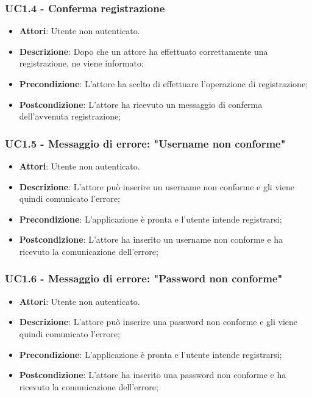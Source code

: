 \subsubsection{UC1.4 - Conferma registrazione} 
\label{sssec:UC1.4} 
\begin{itemize} 
\item \textbf{Attori}: Utente non autenticato.
\item \textbf{Descrizione}: Dopo che un attore ha effettuato correttamente una registrazione, ne viene informato;
\item \textbf{Precondizione}: L'attore ha scelto di effettuare l'operazione di registrazione;
\item \textbf{Postcondizione}: L'attore ha ricevuto un messaggio di conferma dell'avvenuta registrazione;
\end{itemize} 
\subsubsection{UC1.5 - Messaggio di errore: "Username non conforme"} 
\label{sssec:UC1.5} 
\begin{itemize} 
\item \textbf{Attori}: Utente non autenticato.
\item \textbf{Descrizione}: L'attore può inserire un username non conforme e gli viene quindi comunicato l'errore;
\item \textbf{Precondizione}: L'applicazione è pronta e l'utente intende registrarsi;
\item \textbf{Postcondizione}: L'attore ha inserito un username non conforme e ha ricevuto la comunicazione dell'errore;
\end{itemize} 
\subsubsection{UC1.6 - Messaggio di errore: "Password non conforme"} 
\label{sssec:UC1.6} 
\begin{itemize} 
\item \textbf{Attori}: Utente non autenticato.
\item \textbf{Descrizione}: L'attore può inserire una password non conforme e gli viene quindi comunicato l'errore;
\item \textbf{Precondizione}: L'applicazione è pronta e l'utente intende registrarsi;
\item \textbf{Postcondizione}: L'attore ha inserito una password non conforme e ha ricevuto la comunicazione dell'errore;
\end{itemize} 
